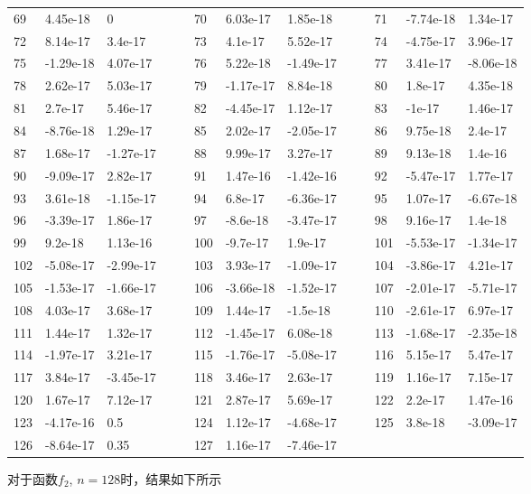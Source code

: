 \documentclass[english]{ctexart}
\providecommand{\tabularnewline}{\\}
\begin{document}
\begin{tabular}{lllllllllllll}
69 & 4.45e-18 & 0 &  &  & 70 & 6.03e-17 & 1.85e-18 &  &  & 71 & -7.74e-18 & 1.34e-17\tabularnewline
72 & 8.14e-17 & 3.4e-17 &  &  & 73 & 4.1e-17 & 5.52e-17 &  &  & 74 & -4.75e-17 & 3.96e-17\tabularnewline
75 & -1.29e-18 & 4.07e-17 &  &  & 76 & 5.22e-18 & -1.49e-17 &  &  & 77 & 3.41e-17 & -8.06e-18\tabularnewline
78 & 2.62e-17 & 5.03e-17 &  &  & 79 & -1.17e-17 & 8.84e-18 &  &  & 80 & 1.8e-17 & 4.35e-18\tabularnewline
81 & 2.7e-17 & 5.46e-17 &  &  & 82 & -4.45e-17 & 1.12e-17 &  &  & 83 & -1e-17 & 1.46e-17\tabularnewline
84 & -8.76e-18 & 1.29e-17 &  &  & 85 & 2.02e-17 & -2.05e-17 &  &  & 86 & 9.75e-18 & 2.4e-17\tabularnewline
87 & 1.68e-17 & -1.27e-17 &  &  & 88 & 9.99e-17 & 3.27e-17 &  &  & 89 & 9.13e-18 & 1.4e-16\tabularnewline
90 & -9.09e-17 & 2.82e-17 &  &  & 91 & 1.47e-16 & -1.42e-16 &  &  & 92 & -5.47e-17 & 1.77e-17\tabularnewline
93 & 3.61e-18 & -1.15e-17 &  &  & 94 & 6.8e-17 & -6.36e-17 &  &  & 95 & 1.07e-17 & -6.67e-18\tabularnewline
96 & -3.39e-17 & 1.86e-17 &  &  & 97 & -8.6e-18 & -3.47e-17 &  &  & 98 & 9.16e-17 & 1.4e-18\tabularnewline
99 & 9.2e-18 & 1.13e-16 &  &  & 100 & -9.7e-17 & 1.9e-17 &  &  & 101 & -5.53e-17 & -1.34e-17\tabularnewline
102 & -5.08e-17 & -2.99e-17 &  &  & 103 & 3.93e-17 & -1.09e-17 &  &  & 104 & -3.86e-17 & 4.21e-17\tabularnewline
105 & -1.53e-17 & -1.66e-17 &  &  & 106 & -3.66e-18 & -1.52e-17 &  &  & 107 & -2.01e-17 & -5.71e-17\tabularnewline
108 & 4.03e-17 & 3.68e-17 &  &  & 109 & 1.44e-17 & -1.5e-18 &  &  & 110 & -2.61e-17 & 6.97e-17\tabularnewline
111 & 1.44e-17 & 1.32e-17 &  &  & 112 & -1.45e-17 & 6.08e-18 &  &  & 113 & -1.68e-17 & -2.35e-18\tabularnewline
114 & -1.97e-17 & 3.21e-17 &  &  & 115 & -1.76e-17 & -5.08e-17 &  &  & 116 & 5.15e-17 & 5.47e-17\tabularnewline
117 & 3.84e-17 & -3.45e-17 &  &  & 118 & 3.46e-17 & 2.63e-17 &  &  & 119 & 1.16e-17 & 7.15e-17\tabularnewline
120 & 1.67e-17 & 7.12e-17 &  &  & 121 & 2.87e-17 & 5.69e-17 &  &  & 122 & 2.2e-17 & 1.47e-16\tabularnewline
123 & -4.17e-16 & 0.5 &  &  & 124 & 1.12e-17 & -4.68e-17 &  &  & 125 & 3.8e-18 & -3.09e-17\tabularnewline
126 & -8.64e-17 & 0.35 &  &  & 127 & 1.16e-17 & -7.46e-17 &  &  &  &  & \tabularnewline
\end{tabular}

对于函数$f_{2}$, $n=128$时，结果如下所示
\end{document}
